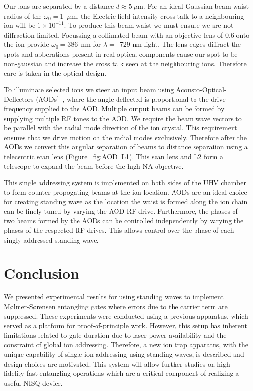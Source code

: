 \documentclass[12pt]{iopart}
\begin{document}
Our ions are separated by a distance $d\approx 5~\mu$m. For an ideal
Gaussian beam waist radius of the $\omega_0 = $1~$\mu$m, the Electric
field intensity cross talk to a neighbouring ion will be
$1\times 10^{-11}$. To produce this beam waist we must ensure we are not
diffraction limited.  Focussing a collimated beam with an objective
lens of 0.6 onto the ion provide $\omega_0 = 386$~nm for
$\lambda=$~729-nm light. The lens edges diffract the spots and
abberations present in real optical components cause our spot to be
non-gaussian and increase the cross talk seen at the neighbouring
ions. Therefore care is taken in the optical design.

To illuminate selected ions we steer an input beam using
Acousto-Optical-Deflectors (AODs)~\cite{nagourney_quantum_2014, li_low_2023, pogorelov_compact_2021}, where the
angle deflected is
proportional to the drive frequency supplied to the AOD. Multiple
output beams can be formed by supplying multiple RF tones to the AOD.
We require the beam wave vectors to be
parallel with the radial mode direction of the ion crystal. This
requirement ensures that we drive motion on the radial modes
exclusively. Therefore after the AODs we convert this angular
separation of beams to distance separation using a telecentric scan
lens (Figure~\ref{fig:AOD} L1).
This scan lens and L2 form a telescope to expand the beam before the
high NA objective.

This single addressing system is implemented on both sides of the UHV
chamber to form counter-propogating beams at the ion location. AODs are
an ideal choice for creating standing wave as the location the waist
is formed along the ion chain can be finely tuned by varying the AOD RF
drive. Furthermore, the phases of two beams formed by the AODs can be
controlled independently by varying the phases of the respected RF
drives. This allows control over the phase of each singly addressed
standing wave.\\


\section{Conclusion}
We presented experimental results for using standing waves to
implement M\o lmer-S\o rensen entangling gates where errors due to the
carrier term are suppressed. These experiments were conducted using a
previous apparatus, which served as a platform for proof-of-principle
work. However, this setup has inherent limitations related to gate
duration due to laser power availability and the constraint of global
ion addressing.
Therefore, a new ion trap apparatus, with the unique capability of
single ion addressing using standing waves, is described and design
choices are motivated. This system will allow further studies on high
fidelity fast entangling operations which are a critical component of
realizing a useful NISQ device.
\end{document}
